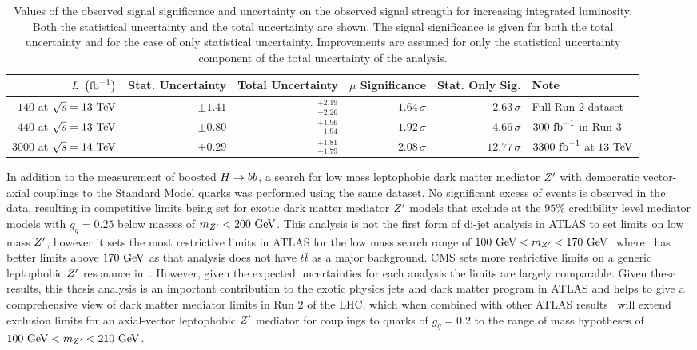 \begin{table}[htbp]
 \centering
 \caption[Values of the observed signal significance and uncertainty on the observed signal strength for increasing integrated luminosity.]{%
  Values of the observed signal significance and uncertainty on the observed signal strength for increasing integrated luminosity.
  Both the statistical uncertainty and the total uncertainty are shown.
  The signal significance is given for both the total uncertainty and for the case of only statistical uncertainty.
  Improvements are assumed for only the statistical uncertainty component of the total uncertainty of the analysis.}
 \label{table:signal_significance_lumi_scaling}
 \begin{adjustbox}{max width=\textwidth}
  \begin{tabular}{@{}rrrrrl@{}} \toprule
   $L~\left(\mathrm{fb}^{-1}\right)$        & Stat. Uncertainty & Total Uncertainty  & $\mu$ Significance & Stat. Only Sig. & Note                     \\ \midrule
   $140$ at $\sqrt{s}=13~\mathrm{TeV}$  & $\pm1.41$         & $_{-2.26}^{+2.19}$ & $1.64\,\sigma$     & $2.63\,\sigma$  & Full Run 2 dataset       \\
   $440$ at $\sqrt{s}=13~\mathrm{TeV}$  & $\pm0.80$         & $_{-1.94}^{+1.96}$ & $1.92\,\sigma$     & $4.66\,\sigma$  & $300~\mathrm{fb}^{-1}$ in Run 3      \\
   $3000$ at $\sqrt{s}=14~\mathrm{TeV}$ & $\pm0.29$         & $_{-1.79}^{+1.81}$ & $2.08\,\sigma$     & $12.77\,\sigma$ & $3300~\mathrm{fb}^{-1}$ at $13~\mathrm{TeV}$ \\
   \bottomrule
  \end{tabular}
 \end{adjustbox}
\end{table}

In addition to the measurement of boosted $H \to b\bar{b}$, a search for low mass leptophobic dark matter mediator $Z^{\prime}$ with democratic vector-axial couplings to the Standard Model quarks was performed using the same dataset.
No significant excess of events is observed in the data, resulting in competitive limits being set for exotic dark matter mediator $Z^{\prime}$ models that exclude at the $95\%$ credibility level mediator models with $g_{q} = 0.25$ below masses of $m_{Z^{\prime}} < 200~\mathrm{GeV}$.
This analysis is not the first form of di-jet analysis in ATLAS to set limits on low mass $Z^{\prime}$, however it sets the most restrictive limits in ATLAS for the low mass search range of $100~\mathrm{GeV} < m_{Z^{\prime}} <170~\mathrm{GeV}$, where~\cite{EXOT-2017-01} has better limits above $170~\mathrm{GeV}$ as that analysis does not have $t\bar{t}$ as a major background.
CMS sets more restrictive limits on a generic leptophobic $Z^{\prime}$ resonance in~\cite{CMS:2019hlx}.
However, given the expected uncertainties for each analysis the limits are largely comparable.
Given these results, this thesis analysis is an important contribution to the exotic physics jets and dark matter program in ATLAS and helps to give a comprehensive view of dark matter mediator limits in Run 2 of the LHC, which when combined with other ATLAS results~\cite{EXOT-2017-32} will extend exclusion limits for an axial-vector leptophobic $Z^{\prime}$ mediator for couplings to quarks of $g_{q} = 0.2$ to the range of mass hypotheses of $100~\mathrm{GeV} < m_{Z^{\prime}} < 210~\mathrm{GeV}$.

